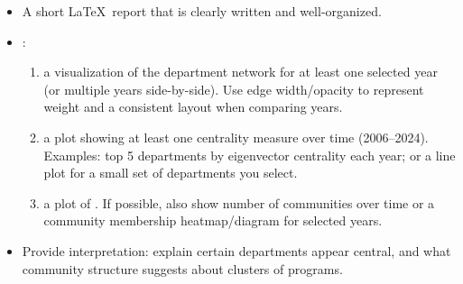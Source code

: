 \documentclass[article, 11pt]{article}
\begin{document}
\vspace{.35cm}

\noindent {}

\vspace{-.26cm}
\noindent \hrulefill

\begin{itemize}
\item A short \LaTeX\, report that is clearly written and well-organized.
\item {}:
  \begin{enumerate}
    \item {} a visualization of the department network for at least one selected year (or multiple years side-by-side). Use edge width/opacity to represent weight and a consistent layout when comparing years.
    \item {} a plot showing at least one centrality measure over time (2006--2024). Examples: top 5 departments by eigenvector centrality each year; or a line plot for a small set of departments you select.
    \item {} a plot of . If possible, also show number of communities over time or a community membership heatmap/diagram for selected years.
  \end{enumerate}
\item Provide interpretation: explain  certain departments appear central, and what community structure suggests about clusters of programs.
\end{itemize}

\vspace{.35cm}

\noindent {}

\vspace{-.35cm}
\noindent \hrulefill
\end{document}
